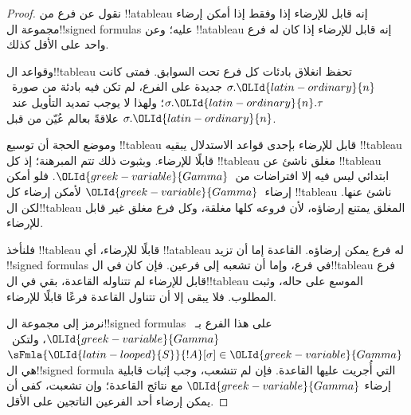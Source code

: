 \documentclass[../../../include/open-logic-section]{subfiles}
\begin{document}
\begin{proof}
نقول عن فرع من !!a{tableau} إنه قابل للإرضاء إذا وفقط إذا أمكن إرضاء
مجموعة ال!!{signed formula}s عليه؛ وعن !!a{tableau} إنه قابل للإرضاء
إذا كان له فرع واحد على الأقل كذلك.

وقواعد ال!!{tableau} تحفظ انغلاق بادئات كل فرع تحت السوابق. فمتى كانت
$\sigma.\OLId{latin-ordinary}{n}$ جديدة على الفرع، لم تكن فيه بادئة من صورة~$\sigma.\OLId{latin-ordinary}{n}.\tau$؛
ولهذا لا يوجب تمديد التأويل عند~$\sigma.\OLId{latin-ordinary}{n}$ علاقةً بعالم عُيّن من قبل.

وموضع الحجة أن توسيع !!{tableau} قابل للإرضاء بإحدى قواعد الاستدلال
يبقيه !!{tableau} قابلًا للإرضاء. وبثبوت ذلك تتم المبرهنة؛ إذ كل
!!{tableau} مغلق ناشئ عن !!{tableau} ابتدائي ليس فيه إلا افتراضات
من~$\OLId{greek-variable}{Gamma}$. فلو أمكن إرضاء~$\OLId{greek-variable}{Gamma}$ لأمكن إرضاء كل !!{tableau}
ناشئ عنها. لكن ال!!{tableau} المغلق يمتنع إرضاؤه، لأن فروعه كلها
مغلقة، وكل فرع مغلق غير قابل للإرضاء.

فلنأخذ !!{tableau} قابلًا للإرضاء، أي !!a{tableau} له فرع يمكن إرضاؤه.
القاعدة إما أن تزيد !!{signed formula}s في فرع، وإما أن تشعبه إلى
فرعين. فإن كان في ال!!{tableau} فرع قابل للإرضاء لم تتناوله القاعدة،
بقي في ال!!{tableau} الموسع على حاله، وثبت المطلوب. فلا يبقى إلا أن
تتناول القاعدة فرعًا قابلًا للإرضاء.

نرمز إلى مجموعة ال!!{signed formula}s على هذا الفرع بـ~$\OLId{greek-variable}{Gamma}$،
ولتكن~$\sFmla{\OLId{latin-looped}{S}}{!A}[\sigma] \in \OLId{greek-variable}{Gamma}$ هي ال!!{signed formula}
التي أُجريت عليها القاعدة. فإن لم تتشعب، وجب إثبات قابلية إرضاء
$\OLId{greek-variable}{Gamma}$ مع نتائج القاعدة؛ وإن تشعبت، كفى أن يمكن إرضاء أحد الفرعين
الناتجين على الأقل.


\end{proof}
\end{document}
